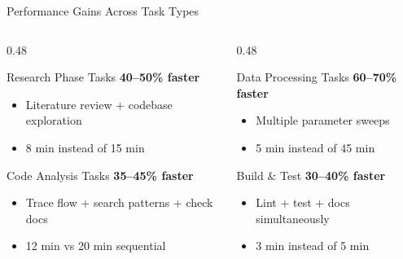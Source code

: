 \documentclass[aspectratio=169,11pt]{beamer}
\begin{document}
\begin{frame}{Performance Gains Across Task Types}
    \begin{columns}[T]
        \begin{column}{0.48\textwidth}
            \begin{block}{Research Phase Tasks}
                \textbf{40--50\% faster}
                \begin{itemize}
                    \item Literature review + codebase exploration
                    \item 8 min instead of 15 min
                \end{itemize}
            \end{block}

            \begin{block}{Code Analysis Tasks}
                \textbf{35--45\% faster}
                \begin{itemize}
                    \item Trace flow + search patterns + check docs
                    \item 12 min vs 20 min sequential
                \end{itemize}
            \end{block}
        \end{column}
        \begin{column}{0.48\textwidth}
            \begin{block}{Data Processing Tasks}
                \textbf{60--70\% faster}
                \begin{itemize}
                    \item Multiple parameter sweeps
                    \item 5 min instead of 45 min
                \end{itemize}
            \end{block}

            \begin{block}{Build \& Test}
                \textbf{30--40\% faster}
                \begin{itemize}
                    \item Lint + test + docs simultaneously
                    \item 3 min instead of 5 min
                \end{itemize}
            \end{block}
        \end{column}
    \end{columns}


\end{frame}
\end{document}
